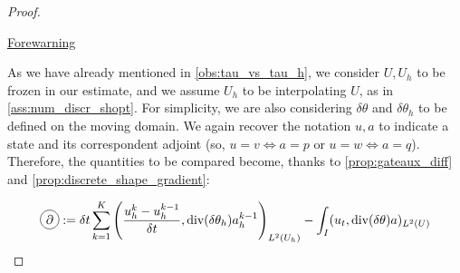\documentclass[english,a4paper,9pt,oneside]{scrbook}	%
\theoremstyle{break}
\newenvironment{mproof}[1][\proofname]{%
  \begin{proof}[#1]$ $\par\nobreak\ignorespaces
}{%
  \end{proof}
}
\renewcommand*{\proofname}{Proof}
\theoremstyle{remark}
\newcommand{\te}{\theta}
\newcommand{\dive}{\text{div}}
\newcommand*\circled[1]{\tikz[baseline=(char.base)]{
            \node[shape=circle,draw,inner sep=2pt] (char) {#1};}}
\begin{document}
\begin{mproof}

\underline{Forewarning}

As we have already mentioned in \cref{obs:tau_vs_tau_h}, we consider $U, U_h$ to be frozen in our estimate, and we assume $U_h$ to be interpolating $U$, as in \cref{ass:num_discr_shopt}. For simplicity, we are also considering $\delta \theta$ and $\delta \theta_h$ to be defined on the moving domain. We again recover the notation $u, a$ to indicate a state and its correspondent adjoint (so, $u=v \iff a = p$ or $u=w \iff a = q$). Therefore, the quantities to be compared become, thanks to \cref{prop:gateaux_diff} and \cref{prop:discrete_shape_gradient}:
%
%
%
%
%


\begin{align*}
	\circled{$\partial$}:=\delta t \sum_{k=1}^{K} \left (\frac{u_h^{k}-u_h^{k-1}}{\delta t}, \dive(\delta \theta_h ) a_h^{k-1} \right )_{L^2(U_h)}  - \int_I (u_t , \dive(\delta \te) a)_{L^2(U)}
\end{align*}


\end{mproof}
\end{document}
